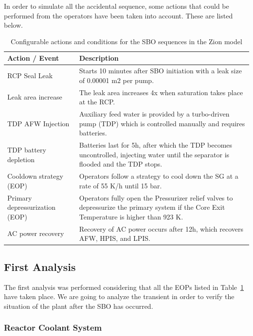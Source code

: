 \documentclass[a4paper,11pt]{article}
\numberwithin{subsubsection}{subsection}
\numberwithin{subsection}{section}
\newcommand{\tabref}[1]{Table~\ref{#1}}
\begin{document}
In order to simulate all the accidental sequence, some actions that 
could be performed from the operators have been taken into account. These are
listed below. 








\begin{table}[h!]
\centering
\renewcommand{\arraystretch}{1.3}
\begin{tabular}{|p{4.5cm}|p{10.5cm}|}
\hline
\textbf{Action / Event} & \textbf{Description} \\ \hline
RCP Seal Leak & Starts 10 minutes after SBO initiation with a leak size of 0.00001 m2 per pump. \\ \hline
Leak area increase & The leak area increases 4x when saturation takes place at the RCP. \\ \hline
TDP AFW Injection & Auxiliary feed water is provided by a turbo-driven pump (TDP) which is controlled manually and requires batteries. \\ \hline
TDP battery depletion & Batteries last for 5h, after which the TDP becomes uncontrolled, injecting water until the separator is flooded and the TDP stops. \\ \hline
Cooldown strategy (EOP) & Operators follow a strategy to cool down the SG at a rate of 55 K/h until 15 bar. \\ \hline
Primary depressurization (EOP) & Operators fully open the Pressurizer relief valves to depressurize the primary system if the Core Exit Temperature is higher than 923 K. \\ \hline
AC power recovery & Recovery of AC power occurs after 12h, which recovers AFW, HPIS, and LPIS. \\ \hline
\end{tabular}
\caption{Configurable actions and conditions for the SBO sequences in the Zion model}
\label{tab:sbo_actions_en}
\end{table}

\subsection{First Analysis}

\noindent The first analysis was performed considering that all the EOPs
listed in \tabref{tab:sbo_actions_en} have taken place. We are going to 
analyze the transient in order to verify the situation of the plant after the 
SBO has occurred. 

\subsubsection{Reactor Coolant System}
\end{document}
